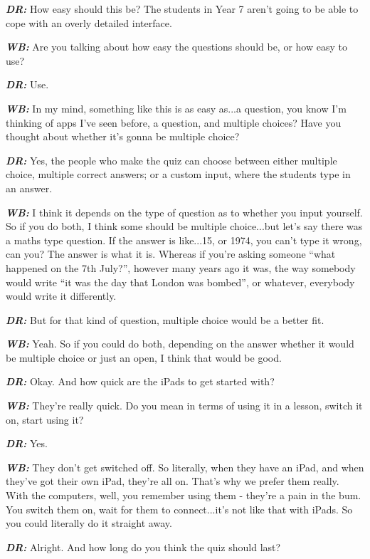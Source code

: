 \textit{\textbf{DR:}} How easy should this be? The students in Year 7 aren't going to be able to cope with an overly detailed interface.

\textit{\textbf{WB:}} Are you talking about how easy the questions should be, or how easy to use?

\textit{\textbf{DR:}} Use.

\textit{\textbf{WB:}} In my mind, something like this is as easy as...a question, you know I'm thinking of apps I've seen before, a question, and multiple choices? Have you thought about whether it's gonna be multiple choice?

\textit{\textbf{DR:}} Yes, the people who make the quiz can choose between either multiple choice, multiple correct answers; or a custom input, where the students type in an answer.

\textit{\textbf{WB:}} I think it depends on the type of question as to whether you input yourself. So if you do both, I think some should be multiple choice...but let's say there was a maths type question. If the answer is like...15, or 1974, you can't type it wrong, can you? The answer is what it is. Whereas if you're asking someone ``what happened on the 7th July?'', however many years ago it was, the way somebody would write ``it was the day that London was bombed'', or whatever, everybody would write it differently.

\textit{\textbf{DR:}} But for that kind of question, multiple choice would be a better fit.

\textit{\textbf{WB:}} Yeah. So if you could do both, depending on the answer whether it would be multiple choice or just an open, I think that would be good.

\textit{\textbf{DR:}} Okay. And how quick are the iPads to get started with?

\textit{\textbf{WB:}} They're really quick. Do you mean in terms of using it in a lesson, switch it on, start using it?

\textit{\textbf{DR:}} Yes.

\textit{\textbf{WB:}} They don't get switched off. So literally, when they have an iPad, and when they've got their own iPad, they're all on. That's why we prefer them really. With the computers, well, you remember using them - they're a pain in the bum. You switch them on, wait for them to connect...it's not like that with iPads. So you could literally do it straight away.

\textit{\textbf{DR:}} Alright. And how long do you think the quiz should last?

